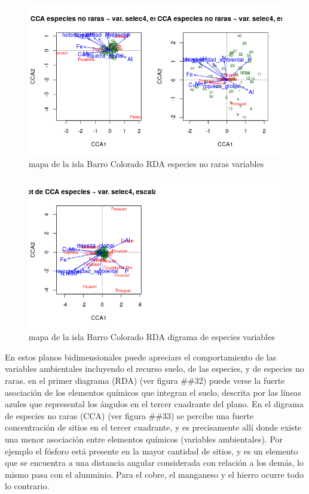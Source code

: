 \documentclass[11pt,]{article}
\begin{document}
\begin{figure}
\centering
\includegraphics[width=1.00000\textwidth]{rda_escalamiento_escala_5.png}
\caption{mapa de la isla Barro Colorado RDA especies no raras
variables\label{fig:bci_map}}
\end{figure}

\begin{figure}
\centering
\includegraphics[width=1.00000\textwidth]{rda_especies_escala_4.png}
\caption{mapa de la isla Barro Colorado RDA digrama de especies
variables\label{fig:bci_map}}
\end{figure}

En estos planos bidimensionales puede apreciars el comportamiento de las
variables ambientales incluyendo el recurso suelo, de las especies, y de
especies no raras. en el primer diagrama (RDA) (ver figura \#\#32) puede
verse la fuerte asociación de los elementos químicos que integran el
suelo, descrita por las líneas azules que represental los ángulos en el
tercer cuadrante del plano. En el digrama de especies no raras (CCA)
(ver figura \#\#33) se percibe una fuerte concentración de sitios en el
tercer cuadrante, y es precisamente allí donde existe una menor
asociación entre elementos químicos (variables ambientales). Por ejemplo
el fósforo está presente en la mayor cantidad de sitios, y es un
elemento que se encuentra a una distancia angular considerada con
relación a los demás, lo mismo pasa con el alunminio. Para el cobre, el
manganeso y el hierro ocurre todo lo contrario.
\end{document}
